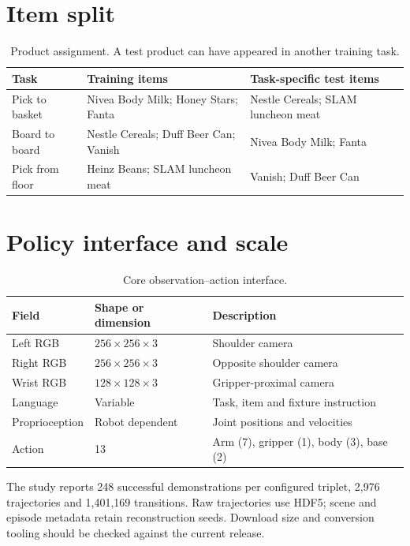 \section{Item split}
\begin{table}[H]\centering
\begin{tabular}{p{}p{}p{}}
\toprule Task & Training items & Task-specific test items\\\midrule
Pick to basket & Nivea Body Milk; Honey Stars; Fanta & Nestle Cereals; SLAM luncheon meat\\
Board to board & Nestle Cereals; Duff Beer Can; Vanish & Nivea Body Milk; Fanta\\
Pick from floor & Heinz Beans; SLAM luncheon meat & Vanish; Duff Beer Can\\
\bottomrule\end{tabular}
\caption{Product assignment. A test product can have appeared in another training task.}\label{tab:item-split}
\end{table}

\section{Policy interface and scale}
\begin{table}[H]\centering
\begin{tabular}{lll}\toprule
Field & Shape or dimension & Description\\\midrule
Left RGB & $256\times256\times3$ & Shoulder camera\\
Right RGB & $256\times256\times3$ & Opposite shoulder camera\\
Wrist RGB & $128\times128\times3$ & Gripper-proximal camera\\
Language & Variable & Task, item and fixture instruction\\
Proprioception & Robot dependent & Joint positions and velocities\\
Action & 13 & Arm (7), gripper (1), body (3), base (2)\\
\bottomrule\end{tabular}\caption{Core observation--action interface.}\end{table}

The study reports 248 successful demonstrations per configured triplet, 2,976 trajectories and 1,401,169 transitions. Raw trajectories use HDF5; scene and episode metadata retain reconstruction seeds. Download size and conversion tooling should be checked against the current release.
\endgroup
